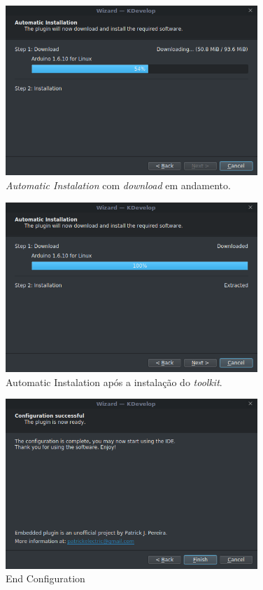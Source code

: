 \begin{figure}[!htb]
  \centering
  \caption[Automatic Instalation executando Download]{\textit{Automatic Instalation} com \textit{download} em andamento.}
  \label{fig:kdevelopinstaller21}
  \includegraphics[width=0.85\textwidth]{figuras/kdevelopInstaller21.png}
\end{figure}

\begin{figure}[!htb]
  \centering
  \caption[Automatic Instalation pós instalação]{Automatic Instalation após a instalação do \textit{toolkit}.}
  \label{fig:kdevelopinstaller22}
  \includegraphics[width=0.85\textwidth]{figuras/kdevelopInstaller22.png}
\end{figure}

\begin{figure}[!htb]
  \centering
  \caption[End Configuration]{End Configuration}
  \label{fig:kdevelopinstaller3}
  \includegraphics[width=0.85\textwidth]{figuras/kdevelopInstaller3.png}
\end{figure}

